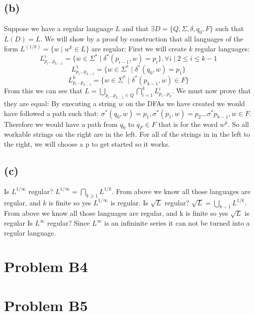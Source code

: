 \documentclass[12pt]{article}
\begin{document}
\subsection*{(b)}
Suppose we have a regular language $L$ and that $\exists    D = \{Q, \Sigma,
\delta, q_0, F\}$ such that $L(D) = L$.
We will show by a proof by construction that all languages of the form
$L^{(1/k)} = \{ w \mid w^k \in L\}$ are regular;
\newline First we will create $k$ regular languages:
$$L^i_{p_i...p_{k-1}} = \{ w \in \Sigma^* \mid \delta^*(p_{i-1},w) = p_i\},
\forall i \mid 2 \le i \le k-1 $$
$$L^1_{p_i...p_{k-1}} = \{ w \in \Sigma^* \mid \delta^*(q_0,w) = p_1\}$$
$$L^k_{p_i...p_{k-1}} = \{ w \in \Sigma^* \mid \delta^*(p_{k-1},w) \in F\}$$
From this we can see that
$L = \bigcup_{p_i...p_{k-1} \in Q} \bigcap^k_{i=1} L^i_{p_i...p_k}$.
We must now prove that they are equal:
\newline
By executing a string $w$ on the DFAs we have created we would have followed
a path such that:
$\sigma^*(q_0,w) = p_1 , \sigma^*(p_1, w) = p_2 ... \sigma^*{p_{k-1}, w} \in F$.
Therefore we would have a path from $q_0$ to $q_F \in F$ that is for the word
$w^k$. So all workable strings on the right are in the left.
\newline
For all of the strings in in the left to the right,
we will choose a p to get started so it works.
\subsection*{(c)}
Is $L^{1/\infty}$ regular? $L^{1/\infty} = \bigcap_{k\ge1}L^{1/k}$.
From above we know all those languages are regular, and $k$ is finite so
yes $L^{1/\infty}$ is regular.
\newline
Is $\sqrt{L}$ regular? $\sqrt{L} = \bigcup_{k-1}L^{1/k}$.
From above we know all those languages are regular,
and k is finite so yes $\sqrt{L}$ is regular
\newline
Is $L^{\infty}$ regular? Since $L^{\infty}$ is an infininite series it can not be turned into a regular language.
\section*{Problem B4}

\section*{Problem B5}
\end{document}
